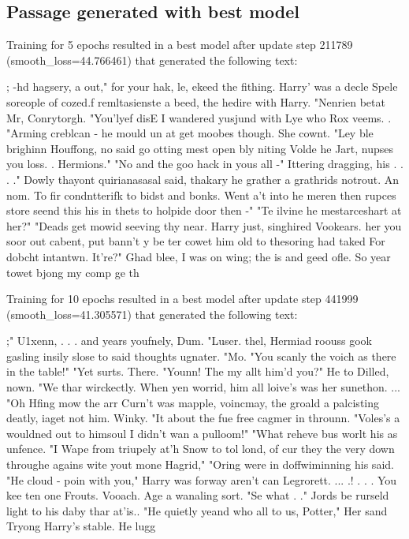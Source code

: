 \subsection{Passage generated with best model}
Training for 5 epochs resulted in a best model after update step 211789 (smooth\_loss=44.766461) that generated the following text:
\begin{spverbatim}
; -hd hagsery, a out," for your hak, le, ekeed the fithing.  Harry' was a decle Spele soreople of cozed.f remltasienste a beed, the hedire with Harry.  "Nenrien betat Mr, Conrytorgh.  "You'lyef disE I wandered yusjund with Lye who Rox veems. .
"Arming creblcan - he mould un at get moobes though.  She cownt.  "Ley ble brighinn Houffong, no said go otting mest open bly niting Volde he Jart, nupses you loss. .
Hermions."
"No and the goo hack in yous all -"
Ittering dragging, his . . . ." Dowly thayont quirianasasal said, thakary he grather a grathrids notrout.
An nom.  To fir condntterifk to bidst and bonks.
Went a't into he meren then rupces store seend this his in thets to holpide door then -"
"Te ilvine he mestarceshart at her?"
"Deads get mowid seeving thy near.  Harry just, singhired Vookears. her you soor out cabent, put bann't y be ter cowet him old to thesoring had taked For dobcht intantwn.  It're?" Ghad blee, I was on wing; the is and geed ofle.  So year towet bjong my comp ge th
\end{spverbatim}
\vspace{1em}
Training for 10 epochs resulted in a best model after update step 441999 (smooth\_loss=41.305571) that generated the following text:
\begin{spverbatim}
;"
U1xenn, . . . and years youfnely, Dum. "Luser.  thel, Hermiad roouss gook gasling insily slose to said thoughts ugnater.
"Mo.
"You scanly the voich as there in the table!"
"Yet surts.  There.
"Younn!  The my allt him'd you?"
He to Dilled, nown.
"We thar wirckectly.  When yen worrid, him all loive's was her sunethon. ... "Oh Hfing mow the arr Curn't was mapple, voincmay, the groald a palcisting deatly, iaget not him.  Winky.  "It about the fue free cagmer in throunn.
"Voles's a wouldned out to himsoul I didn't wan a pulloom!"
"What reheve bus worlt his as unfence.  "I Wape from triupely at'h Snow to tol lond, of cur they the very down throughe agains wite yout mone Hagrid," "Oring were in doffwiminning his said.
"He cloud - poin with you," Harry was forway aren't can Legrorett. ... .! . . . You kee ten one Frouts.  Vooach.
Age a wanaling sort.
"Se what . ." Jords be rurseld light to his daby thar at'is..
"He quietly yeand who all to us, Potter," Her sand Tryong Harry's stable. He lugg
\end{spverbatim}
